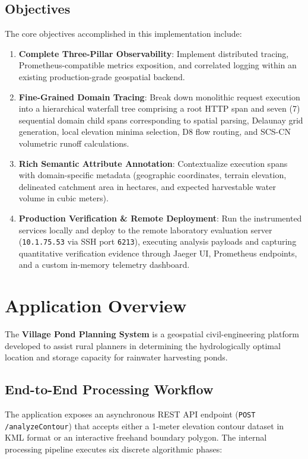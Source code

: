 \documentclass[11pt,a4paper]{article}
\begin{document}
\subsection{Objectives}
The core objectives accomplished in this implementation include:
\begin{enumerate}[leftmargin=*]
    \item \textbf{Complete Three-Pillar Observability}: Implement distributed tracing, Prometheus-compatible metrics exposition, and correlated logging within an existing production-grade geospatial backend.
    \item \textbf{Fine-Grained Domain Tracing}: Break down monolithic request execution into a hierarchical waterfall tree comprising a root HTTP span and seven (7) sequential domain child spans corresponding to spatial parsing, Delaunay grid generation, local elevation minima selection, D8 flow routing, and SCS-CN volumetric runoff calculations.
    \item \textbf{Rich Semantic Attribute Annotation}: Contextualize execution spans with domain-specific metadata (geographic coordinates, terrain elevation, delineated catchment area in hectares, and expected harvestable water volume in cubic meters).
    \item \textbf{Production Verification \& Remote Deployment}: Run the instrumented services locally and deploy to the remote laboratory evaluation server (\texttt{10.1.75.53} via SSH port \texttt{6213}), executing analysis payloads and capturing quantitative verification evidence through Jaeger UI, Prometheus endpoints, and a custom in-memory telemetry dashboard.
\end{enumerate}

\section{Application Overview}

The \textbf{Village Pond Planning System} is a geospatial civil-engineering platform developed to assist rural planners in determining the hydrologically optimal location and storage capacity for rainwater harvesting ponds.

\subsection{End-to-End Processing Workflow}
The application exposes an asynchronous REST API endpoint (\texttt{POST /analyzeContour}) that accepts either a 1-meter elevation contour dataset in KML format or an interactive freehand boundary polygon. The internal processing pipeline executes six discrete algorithmic phases:
\end{document}
